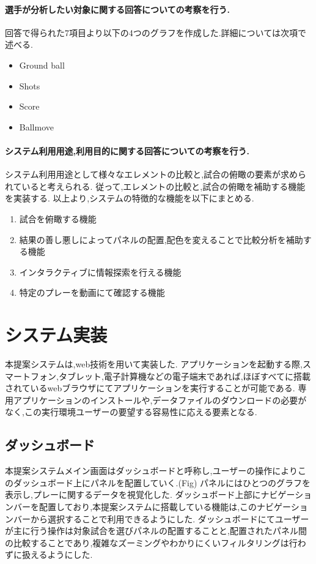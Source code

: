 \documentclass[sotsuron]{kuee}
\begin{document}
					\paragraph {選手が分析したい対象に関する回答についての考察を行う.}
						回答で得られた7項目より以下の4つのグラフを作成した.詳細については次項で述べる.
							\begin{itemize}
								\item Ground ball
								\item Shots
								\item Score
								\item Ballmove
							\end{itemize}
					\paragraph {システム利用用途,利用目的に関する回答についての考察を行う.}
						システム利用用途として様々なエレメントの比較と,試合の俯瞰の要素が求められていると考えられる.
						従って,エレメントの比較と,試合の俯瞰を補助する機能を実装する.
						以上より,システムの特徴的な機能を以下にまとめる.
						\begin{enumerate}	
							\item 試合を俯瞰する機能
							\item 結果の善し悪しによってパネルの配置,配色を変えることで比較分析を補助する機能
							\item インタラクティブに情報探索を行える機能
							\item 特定のプレーを動画にて確認する機能
						\end{enumerate}
	\section{システム実装}
			本提案システムは,web技術を用いて実装した.
			アプリケーションを起動する際,スマートフォン,タブレット,電子計算機などの電子端末であれば,ほぼすべてに搭載されているwebブラウザにてアプリケーションを実行することが可能である.
			専用アプリケーションのインストールや,データファイルのダウンロードの必要がなく,この実行環境ユーザーの要望する容易性に応える要素となる.
		\subsection{ダッシュボード}
			本提案システムメイン画面はダッシュボードと呼称し,ユーザーの操作によりこのダッシュボード上にパネルを配置していく.(Fig)
			パネルにはひとつのグラフを表示し,プレーに関するデータを視覚化した.
			ダッシュボード上部にナビゲーションバーを配置しており,本提案システムに搭載している機能は,このナビゲーションバーから選択することで利用できるようにした.
			ダッシュボードにてユーザーが主に行う操作は対象試合を選びパネルの配置することと,配置されたパネル間の比較することであり,複雑なズーミングやわかりにくいフィルタリングは行わずに扱えるようにした.
\end{document}
